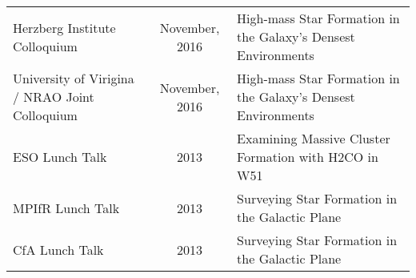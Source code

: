 \begin{minipage}{\textwidth}
\begin{tabular}{p{1.8in}cp{3.5in}}
    Herzberg Institute Colloquium & November, 2016 & High-mass Star Formation in the Galaxy's Densest Environments \\
    University of Virigina / NRAO Joint Colloquium & November, 2016 & High-mass Star Formation in the Galaxy's Densest Environments \\
    ESO Lunch Talk & 2013 & Examining Massive Cluster Formation with H2CO in W51 \\
    MPIfR Lunch Talk & 2013 & Surveying Star Formation in the Galactic Plane  \\
    CfA Lunch Talk & 2013 & Surveying Star Formation in the Galactic Plane  \\
\end{tabular}
\end{minipage}
\vspace{4mm}
